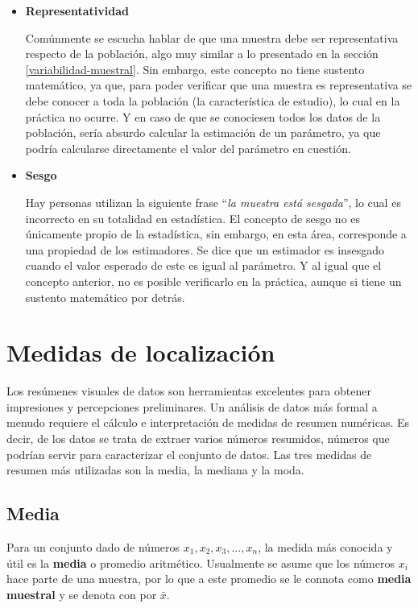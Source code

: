 \documentclass[
  11pt,
]{book}
\theoremstyle{definition}
\theoremstyle{definition}
\theoremstyle{definition}
\theoremstyle{definition}
\theoremstyle{remark}
\begin{document}
\begin{itemize}
\item
  \textbf{Representatividad}

  Comúnmente se escucha hablar de que una muestra debe ser representativa respecto de la población, algo muy similar a lo presentado en la sección \ref{variabilidad-muestral}. Sin embargo, este concepto no tiene sustento matemático, ya que, para poder verificar que una muestra es representativa se debe conocer a toda la población (la característica de estudio), lo cual en la práctica no ocurre. Y en caso de que se conociesen todos los datos de la población, sería absurdo calcular la estimación de un parámetro, ya que podría calcularse directamente el valor del parámetro en cuestión.
\item
  \textbf{Sesgo}

  Hay personas utilizan la siguiente frase ``\emph{la muestra está sesgada}'', lo cual es incorrecto en su totalidad en estadística. El concepto de sesgo no es únicamente propio de la estadística, sin embargo, en esta área, corresponde a una propiedad de los estimadores. Se dice que un estimador es insesgado cuando el valor esperado de este es igual al parámetro. Y al igual que el concepto anterior, no es posible verificarlo en la práctica, aunque si tiene un sustento matemático por detrás.
\end{itemize}

\section{Medidas de localización}\label{medidas-de-localizaciuxf3n}

Los resúmenes visuales de datos son herramientas excelentes para obtener impresiones y percepciones preliminares. Un análisis de datos más formal a menudo requiere el cálculo e interpretación de medidas de resumen numéricas. Es decir, de los datos se trata de extraer varios números resumidos, números que podrían servir para caracterizar el conjunto de datos. Las tres medidas de resumen más utilizadas son la media, la mediana y la moda.

\subsection{Media}\label{media}

Para un conjunto dado de números \(x_1, x_2, x_3, \ldots, x_n\), la medida más conocida y útil es la \textbf{media} o promedio aritmético. Usualmente se asume que los números \(x_i\) hace parte de una muestra, por lo que a este promedio se le connota como \textbf{media muestral} y se denota con por \(\bar{x}\).
\end{document}
